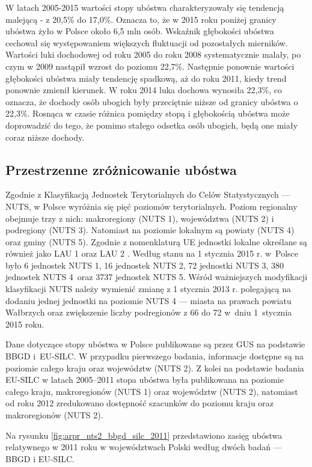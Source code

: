 W latach 2005-2015 wartości stopy ubóstwa charakteryzowały się tendencją malejącą - z 20,5\% do 17,0\%. Oznacza to, że w 2015 roku poniżej granicy ubóstwa żyło w Polsce około 6,5 mln osób. Wskaźnik głębokości ubóstwa cechował się występowaniem większych fluktuacji od pozostałych mierników. Wartości luki dochodowej od roku 2005 do roku 2008 systematycznie malały, po czym w 2009 nastąpił wzrost do poziomu 22,7\%. Następnie ponownie wartości głębokości ubóstwa miały tendencję spadkową, aż do roku 2011, kiedy trend ponownie zmienił kierunek. W roku 2014 luka dochowa wynosiła 22,3\%, co oznacza, że dochody osób ubogich były przeciętnie niższe od granicy ubóstwa o 22,3\%. Rosnąca w czasie różnica pomiędzy stopą i głębokością ubóstwa może doprowadzić do tego, że pomimo stałego odsetka osób ubogich, będą one miały coraz niższe dochody.

\subsection{Przestrzenne zróżnicowanie ubóstwa}

Zgodnie z Klasyfikacją Jednostek Terytorialnych do Celów Statystycznych --- NUTS, w Polsce wyróżnia się pięć poziomów terytorialnych. Poziom regionalny obejmuje trzy z nich: makroregiony (NUTS 1), województwa (NUTS 2) i podregiony (NUTS 3). Natomiast na poziomie lokalnym są powiaty (NUTS 4) oraz gminy (NUTS 5). Zgodnie z nomenklaturą UE jednostki lokalne określane są również jako LAU 1 oraz LAU 2 \citep{eurostat2011}. Według stanu na 1 stycznia 2015 r. w~Polsce było 6 jednostek NUTS 1, 16 jednostek NUTS 2, 72 jednostki NUTS 3, 380 jednostek NUTS 4~oraz 3737 jednostek NUTS 5. Wśród ważniejszych modyfikacji klasyfikacji NUTS należy wymienić zmianę z 1 stycznia 2013 r. polegającą na dodaniu jednej jednostki na poziomie NUTS 4 --- miasta na prawach powiatu Wałbrzych oraz zwiększenie liczby podregionów z 66 do 72 w~dniu 1~stycznia 2015 roku.

Dane dotyczące stopy ubóstwa w Polsce publikowane są przez GUS na podstawie BBGD i~EU-SILC. W przypadku pierwszego badania, informacje dostępne są na poziomie całego kraju oraz województw (NUTS 2). Z kolei na podstawie badania EU-SILC w latach 2005--2011 stopa ubóstwa była publikowana na poziomie całego kraju, makroregionów (NUTS 1) oraz województw (NUTS 2), natomiast od roku 2012 zredukowano dostępność szacunków do poziomu kraju oraz makroregionów (NUTS 2).

Na rysunku \ref{fig:arpr_nts2_bbgd_silc_2011} przedstawiono zasięg ubóstwa relatywnego w 2011 roku w województwach Polski według dwóch badań --- BBGD i EU-SILC.

